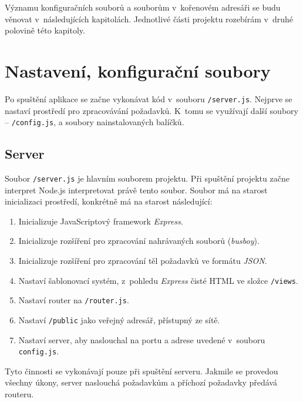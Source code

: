 Významu konfiguračních souborů a souborům v~kořenovém adresáři se budu věnovat v~následujících kapitolách. Jednotlivé části projektu rozebírám v~druhé polovině této kapitoly.

\section{Nastavení, konfigurační soubory}
Po spuštění aplikace se začne vykonávat kód v~souboru \texttt{/server.js}. Nejprve se nastaví prostředí pro zpracovávání požadavků. K~tomu se využívají další soubory -- \texttt{/config.js},  a soubory nainstalovaných balíčků.

\subsection{Server}
Soubor \texttt{/server.js} je hlavním souborem projektu. Při spuštění projektu začne interpret Node.js interpretovat právě tento soubor. Soubor má na starost inicializaci prostředí, konkrétně má na starost následující:
\begin{enumerate}
\item Inicializuje JavaScriptový framework \textit{Express}.
\item Inicializuje rozšíření pro zpracování nahrávaných souborů (\textit{busboy}).
\item Inicializuje rozšíření pro zpracování těl požadavků ve formátu \textit{JSON}.
\item Nastaví šablonovací systém, z~pohledu \textit{Express} čisté HTML ve složce \texttt{/views}.
\item Nastaví router na \texttt{/router.js}.
\item Nastaví \texttt{/public} jako veřejný adresář, přístupný ze sítě.
\item Nastaví server, aby naslouchal na portu a adrese uvedené v~souboru \texttt{config.js}.
\end{enumerate}
Tyto činnosti se vykonávají pouze při spuštění serveru. Jakmile se provedou všechny úkony, server naslouchá požadavkům a příchozí požadavky předává routeru.

